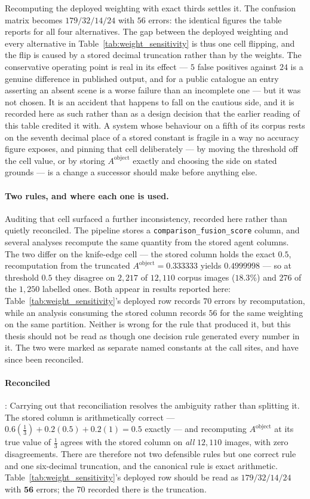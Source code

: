 \documentclass[12pt,a4paper]{report}
\begin{document}
Recomputing the deployed weighting with exact thirds settles it. The confusion matrix becomes
$179/32/14/24$ with $56$ errors: the identical figures the table reports for all four
alternatives. The gap between the deployed weighting and every alternative in
Table~\ref{tab:weight_sensitivity} is thus one cell flipping, and the flip is caused by a stored
decimal truncation rather than by the weights. The conservative operating point is real in its
effect --- $5$ false positives against $24$ is a genuine difference in published output, and for a
public catalogue an entry asserting an absent scene is a worse failure than an incomplete one ---
but it was not chosen. It is an accident that happens to fall on the cautious side, and it is
recorded here as such rather than as a design decision that the earlier reading of this table
credited it with. A system whose behaviour on a fifth of its corpus rests on the seventh decimal
place of a stored constant is fragile in a way no accuracy figure exposes, and pinning that cell
deliberately --- by moving the threshold off the cell value, or by storing $A^{\text{object}}$
exactly and choosing the side on stated grounds --- is a change a successor should make before
anything else.

\paragraph{Two rules, and where each one is used.} Auditing that cell surfaced a further
inconsistency, recorded here rather than quietly reconciled. The pipeline stores a
\texttt{comparison\_fusion\_score} column, and several analyses recompute the same quantity from
the stored agent columns. The two differ on the knife-edge cell --- the stored column holds the
exact $0.5$, recomputation from the truncated $A^{\text{object}}=0.333333$ yields $0.4999998$ ---
so at threshold $0.5$ they disagree on $2{,}217$ of $12{,}110$ corpus images ($18.3\%$) and $276$
of the $1{,}250$ labelled ones. Both appear in results reported here:
Table~\ref{tab:weight_sensitivity}'s deployed row records $70$ errors by recomputation, while an
analysis consuming the stored column records $56$ for the same weighting on the same partition.
Neither is wrong for the rule that produced it, but this thesis should not be read as though one
decision rule generated every number in it. The two were marked as separate named constants at the call sites, and have since
been reconciled.

\paragraph{Reconciled}: Carrying out that reconciliation resolves the ambiguity rather than
splitting it. The stored column is arithmetically correct --- $0.6(\tfrac13) + 0.2(0.5) + 0.2(1)
= 0.5$ exactly --- and recomputing $A^{\text{object}}$ at its true value of $\tfrac13$ agrees with
the stored column on \emph{all} $12{,}110$ images, with zero disagreements. There are therefore
not two defensible rules but one correct rule and one six-decimal truncation, and the canonical
rule is exact arithmetic. Table~\ref{tab:weight_sensitivity}'s deployed row should be read as
$179/32/14/24$ with $\mathbf{56}$ errors; the $70$ recorded there is the truncation.
\end{document}
